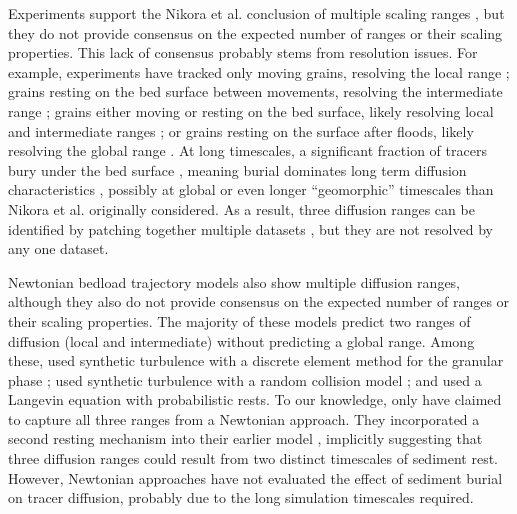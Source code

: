 Experiments support the Nikora et al. conclusion of multiple scaling ranges \citep{Martin2012,Fathel2016}, but they do not provide consensus on the expected number of ranges or their scaling properties.
This lack of consensus probably stems from resolution issues.
For example, experiments have tracked only moving grains, resolving the local range \citep{Furbish2012,Furbish2017,Fathel2016}; grains resting on the bed surface between movements, resolving the intermediate range \citep{Einstein1937,Yano1969,Nakagawa1976}; grains either moving or resting on the bed surface, likely resolving local and intermediate ranges \citep{Martin2012}; or grains resting on the surface after floods, likely resolving the global range \citep{Phillips2013,Bradley2017}. 
At long timescales, a significant fraction of tracers bury under the bed surface \citep{Hassan1991,Hassan2013,Ferguson2002a,Haschenburger2013,Papangelakis2016}, meaning burial dominates long term diffusion characteristics \citep{Bradley2017,Martin2014,Voepel2013}, possibly at global or even longer ``geomorphic'' timescales \citep{Hassan2017} than Nikora et al. originally considered.
As a result, three diffusion ranges can be identified by patching together multiple datasets \citep{Zhang2012,Nikora2002}, but they are not resolved by any one dataset.

Newtonian bedload trajectory models also show multiple diffusion ranges, although they also do not provide consensus on the expected number of ranges or their scaling properties. 
The majority of these models predict two ranges of diffusion (local and intermediate) without predicting a global range.
Among these, \citet{Nikora2001a} used synthetic turbulence \citep{Kraichnan1970} with a discrete element method for the granular phase \citep{Cundall1979}; \citet{Bialik2012} used synthetic turbulence with a random collision model \citep{Sekine1992}; and \citet{Fan2016} used a Langevin equation with probabilistic rests.
To our knowledge, only \citet{Bialik2015} have claimed to capture all three ranges from a Newtonian approach.
They incorporated a second resting mechanism into their earlier model \citep{Bialik2012}, implicitly suggesting that three diffusion ranges could result from two distinct timescales of sediment rest.
However, Newtonian approaches have not evaluated the effect of sediment burial on tracer diffusion, probably due to the long simulation timescales required. 

